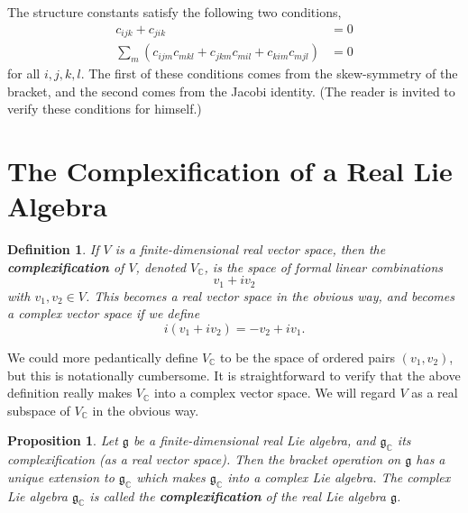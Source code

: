 \documentclass{amsbook}
\let \frak = \mathfrak
\theoremstyle{plain}
\newtheorem{definition}[theorem]{Definition}
\newtheorem{proposition}[theorem]{Proposition}
\numberwithin{equation}{chapter}
\numberwithin{theorem}{chapter}
\begin{document}
The structure constants satisfy the following two conditions,
\begin{align*}
c_{ijk}+c_{jik}  & =0\\
\sum_{m}(c_{ijm}c_{mkl}+c_{jkm}c_{mil}+c_{kim}c_{mjl})  & =0
\end{align*}
for all $i,j,k,l$. The first of these conditions comes from the skew-symmetry
of the bracket, and the second comes from the Jacobi identity. (The reader is
invited to verify these conditions for himself.)

\section{The Complexification of a Real Lie Algebra\label{complex}}

\begin{definition}
If $V$ is a finite-dimensional real vector space, then the
\textbf{complexification} of $V$, denoted $V_{\mathbb{C}}$, is the space of
formal linear combinations
\[
v_{1}+iv_{2}%
\]
with $v_{1},v_{2}\in V$. This becomes a real vector space in the obvious way,
and becomes a complex vector space if we define
\[
i(v_{1}+iv_{2})=-v_{2}+iv_{1}\text{.}%
\]
\end{definition}

We could more pedantically define $V_{\mathbb{C}}$ to be the space of ordered
pairs $(v_{1},v_{2})$, but this is notationally cumbersome. It is
straightforward to verify that the above definition really makes
$V_{\mathbb{C}} $ into a complex vector space. We will regard $V$ as a real
subspace of $V_{\mathbb{C}}$ in the obvious way.

\begin{proposition}
Let $\frak{g}$ be a finite-dimensional real Lie algebra, and \thinspace
$\frak{g}_{\mathbb{C}}$ its complexification (as a real vector space). Then
the bracket operation on $\frak{g}$ has a unique extension to $\frak{g}%
_{\mathbb{C}}$ which makes $\frak{g}_{\mathbb{C}}$ into a complex Lie algebra.
The complex Lie algebra $\frak{g}_{\mathbb{C}}$ is called the
\textbf{complexification} of the real Lie algebra $\frak{g}$.
\end{proposition}
\end{document}
